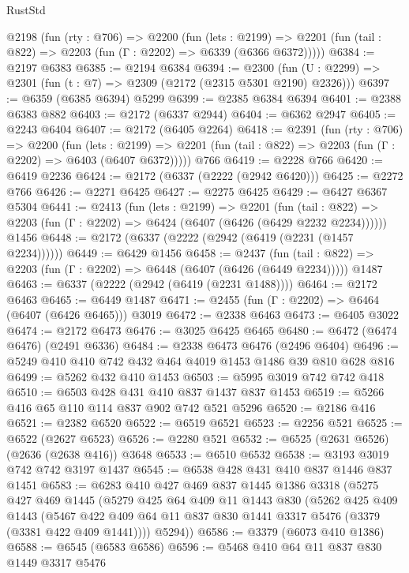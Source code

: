 \begin{lexlean}{RustStd}
\begin{coremodule}
  @2198
    (fun (rty : @706) =>
    @2200
      (fun (lets : @2199) =>
      @2201 (fun (tail : @822) => @2203 (fun (Γ : @2202) => @6339 (@6366 @6372)))))
@6384 := @2197 @6383
@6385 := @2194 @6384
@6394 := @2300 (fun (U : @2299) => @2301 (fun (t : @7) => @2309 (@2172 (@2315 @5301 @2190) @2326)))
@6397 := @6359 (@6385 @6394) @5299
@6399 := @2385 @6384 @6394
@6401 := @2388 @6383 @882
@6403 := @2172 (@6337 @2944)
@6404 := @6362 @2947
@6405 := @2243 @6404
@6407 := @2172 (@6405 @2264)
@6418 := @2391
    (fun (rty : @706) =>
    @2200
      (fun (lets : @2199) =>
      @2201 (fun (tail : @822) => @2203 (fun (Γ : @2202) => @6403 (@6407 @6372)))))
    @766
@6419 := @2228 @766
@6420 := @6419 @2236
@6424 := @2172 (@6337 (@2222 (@2942 @6420)))
@6425 := @2272 @766
@6426 := @2271 @6425
@6427 := @2275 @6425
@6429 := @6427 @6367 @5304
@6441 := @2413
    (fun (lets : @2199) =>
    @2201
      (fun (tail : @822) => @2203 (fun (Γ : @2202) => @6424 (@6407 (@6426 (@6429 @2232 @2234))))))
    @1456
@6448 := @2172 (@6337 (@2222 (@2942 (@6419 (@2231 (@1457 @2234))))))
@6449 := @6429 @1456
@6458 := @2437
    (fun (tail : @822) => @2203 (fun (Γ : @2202) => @6448 (@6407 (@6426 (@6449 @2234)))))
    @1487
@6463 := @6337 (@2222 (@2942 (@6419 (@2231 @1488))))
@6464 := @2172 @6463
@6465 := @6449 @1487
@6471 := @2455 (fun (Γ : @2202) => @6464 (@6407 (@6426 @6465))) @3019
@6472 := @2338 @6463
@6473 := @6405 @3022
@6474 := @2172 @6473
@6476 := @3025 @6425 @6465
@6480 := @6472 (@6474 @6476) (@2491 @6336)
@6484 := @2338 @6473 @6476 (@2496 @6404)
@6496 := @5249 @410 @410 @742 @432 @464 @4019 @1453 @1486 @39 @810 @628 @816
@6499 := @5262 @432 @410 @1453
@6503 := @5995 @3019 @742 @742 @418
@6510 := @6503 @428 @431 @410 @837 @1437 @837 @1453
@6519 := @5266 @416 @65 @110 @114 @837 @902 @742 @521 @5296
@6520 := @2186 @416
@6521 := @2382 @6520
@6522 := @6519 @6521
@6523 := @2256 @521
@6525 := @6522 (@2627 @6523)
@6526 := @2280 @521
@6532 := @6525 (@2631 @6526) (@2636 (@2638 @416)) @3648
@6533 := @6510 @6532
@6538 := @3193 @3019 @742 @742 @3197 @1437
@6545 := @6538 @428 @431 @410 @837 @1446 @837 @1451
@6583 := @6283
    @410
    @427
    @469
    @837
    @1445
    @1386
    @3318
    (@5275
      @427
      @469
      @1445
      (@5279
        @425
        @64
        @409
        @11
        @1443
        @830
        (@5262
          @425
          @409
          @1443
          (@5467 @422 @409 @64 @11 @837 @830 @1441 @3317 @5476 (@3379 (@3381 @422 @409 @1441))))
        @5294))
@6586 := @3379 (@6073 @410 @1386)
@6588 := @6545 (@6583 @6586)
@6596 := @5468 @410 @64 @11 @837 @830 @1449 @3317 @5476

\end{coremodule}
\end{lexlean}
